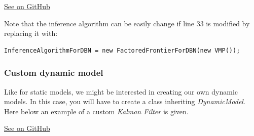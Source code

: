 \documentclass[10pt,a4paper]{article}
\begin{document}
\href{https://github.com/amidst/tutorial/blob/master/src/main/java/eu/amidst/tutorial/usingAmidst/examples/DynamicModelInference.java}{See on GitHub}


Note that the inference algorithm can be easily change if line 33 is modified by replacing it with:

\begin{verbatim}
InferenceAlgorithmForDBN = new FactoredFrontierForDBN(new VMP());
\end{verbatim}


\subsubsection{Custom dynamic model}\label{sec:lvmodels:dynamic:custom}

Like for static models, we might be interested in creating our own dynamic models. In this case, you will have to create a class inheriting \textit{DynamicModel}. Here below an example of a custom \textit{Kalman Filter} is given.

\href{https://github.com/amidst/tutorial/blob/master/src/main/java/eu/amidst/tutorial/usingAmidst/practice/CustomKalmanFilter.java}{See on GitHub}
\end{document}
